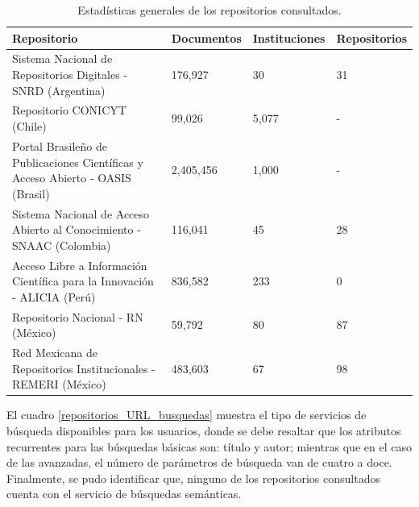 \begin{table}[htbp]
    \begin{center}
    \begin{tabular}{| p{6.5cm}| p{2.1cm} | p{2.2cm} | p{2.2cm} |}
    \hline
    \centering \textbf{Repositorio} & \textbf{Documentos} & \textbf{Instituciones} & \textbf{Repositorios} \\
    \hline \hline
    Sistema Nacional de Repositorios Digitales - SNRD (Argentina) & 176,927 & 30 & 31 \\ \hline
    Repositorio CONICYT (Chile) & 99,026 & 5,077 & - \\ \hline
    Portal Brasileño de Publicaciones Científicas y Acceso Abierto - OASIS (Brasil) & 2,405,456 & 1,000 & - \\ \hline
    Sistema Nacional de Acceso Abierto al Conocimiento - SNAAC (Colombia) & 116,041 & 45 & 28 \\ \hline
    Acceso Libre a Información Científica para la Innovación - ALICIA (Perú) & 836,582 & 233 & 0 \\ \hline
    Repositorio Nacional - RN (México) & 59,792 & 80 & 87 \\ \hline
    Red Mexicana de Repositorios Institucionales - REMERI (México) & 483,603 & 67 & 98 \\ \hline
    \end{tabular}
    \caption{Estadísticas generales de los repositorios consultados.}
    \label{repositorios_URL_estadisticas}
    \end{center}
\end{table}

El cuadro \ref{repositorios_URL_busquedas} muestra el tipo de servicios de búsqueda disponibles para los usuarios, donde se debe resaltar que los atributos recurrentes para las búsquedas básicas son: título y autor; mientras que en el caso de las avanzadas, el número de parámetros de búsqueda van de cuatro a doce. Finalmente, se pudo identificar que, ninguno de los repositorios consultados cuenta con el servicio de búsquedas semánticas.\newline


